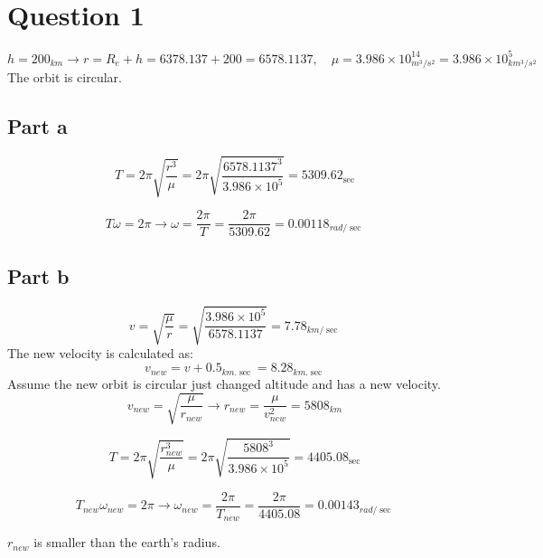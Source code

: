\section{Question 1}
$$
h = 200_{km} \to r = R_e +h = 6378.137 + 200 = 6578.1137,\quad \mu = 3.986  \! \times \! 10^{14}_{m^3/s^2} = 3.986  \! \times \! 10^{5}_{km^3/s^2}
$$
The orbit is circular.

\subsection{Part a}
\begin{equation}
    T = 2\pi \sqrt{\dfrac{r^3}{\mu}} = 2\pi \sqrt{\dfrac{6578.1137^3}{3.986  \! \times \! 10^{5}}} = 5309.62_{\sec}
\end{equation}

\begin{equation}
    T\omega = 2\pi \to \omega = \dfrac{2\pi}{T} = \dfrac{2\pi}{5309.62} = 0.00118_{rad/\sec} 
\end{equation}

\subsection{Part b}

\begin{equation}
    v = \sqrt{\dfrac{\mu}{r}} =  \sqrt{\dfrac{3.986  \! \times \! 10^{5}}{6578.1137}} = 7.78_{km/\sec}
\end{equation}
The new velocity is calculated as:
\begin{equation}
    v_{new} = v + 0.5_{km.\sec} = 8.28_{km.\sec}
\end{equation}
Assume the new orbit is circular just changed altitude and has a new velocity.
\begin{equation}
    v_{new} = \sqrt{\dfrac{\mu}{r_{new}}} \to r_{new} = \dfrac{\mu}{v_{new}^2} = 5808_{km}
\end{equation}

\begin{equation}
    T = 2\pi \sqrt{\dfrac{r_{new}^3}{\mu}} = 2\pi \sqrt{\dfrac{5808^3}{3.986  \! \times \! 10^{5}}} = 4405.08_{\sec}
\end{equation}

\begin{equation}
    T_{new}\omega_{new} = 2\pi \to \omega_{new} = \dfrac{2\pi}{T_{new}} = \dfrac{2\pi}{4405.08} = 0.00143_{rad/\sec} 
\end{equation}

$r_{new}$ is smaller than the earth's radius.
